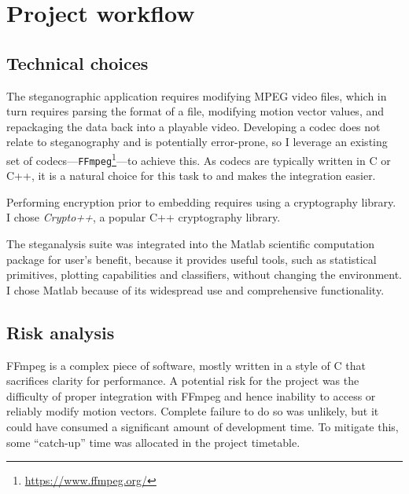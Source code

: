 \documentclass[12pt,british,twoside,notitlepage,usenames,dvipsnames,hypens,final]{report}
\numberwithin{equation}{section}
\numberwithin{figure}{section}
\begin{document}
\section{Project workflow}

\subsection{Technical choices}
\label{tech-choices}

The steganographic application requires modifying MPEG video files, which in turn requires parsing the format of a file, modifying motion vector values, and repackaging the data back into a playable video. Developing a codec does not relate to steganography and is potentially error-prone, so I leverage an existing set of codecs---\texttt{FFmpeg}\footnote{\url{https://www.ffmpeg.org/}}---to achieve this. As codecs are typically written in C or C++, it is a natural choice for this task to and makes the integration easier.

Performing encryption prior to embedding requires using a cryptography library. I chose \emph{Crypto++}, a popular C++ cryptography library.

The steganalysis suite was integrated into the Matlab scientific computation package for user's benefit, because it provides useful tools, such as statistical primitives, plotting capabilities and classifiers, without changing the environment. I chose Matlab  because of its widespread use and comprehensive functionality.

\subsection{Risk analysis}
FFmpeg is a complex piece of software, mostly written in a style of C that sacrifices clarity for performance. A potential risk for the project was the difficulty of proper integration with FFmpeg and hence inability to access or reliably modify motion vectors. Complete failure to do so was unlikely, but it could have consumed a significant amount of development time. To mitigate this, some ``catch-up'' time was allocated in the project timetable.  
\end{document}
